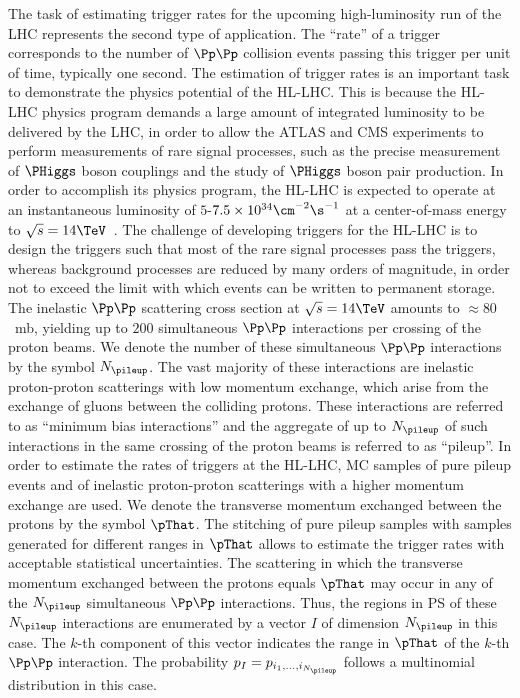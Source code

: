 The task of estimating trigger rates for the upcoming high-luminosity run of the LHC represents the second type of application.
The ``rate'' of a trigger corresponds to the number of $\Pp\Pp$ collision events passing this trigger per unit of time, typically one second.
The estimation of trigger rates is an important task to demonstrate the physics potential of the HL-LHC.
This is because the HL-LHC physics program demands a large amount of integrated luminosity to be delivered by the LHC,
in order to allow the ATLAS and CMS experiments to perform measurements of rare signal processes,
such as the precise measurement of $\PHiggs$ boson couplings and the study of $\PHiggs$ boson pair production.
In order to accomplish its physics program, the HL-LHC is expected to operate at an instantaneous luminosity of $5$-$7.5 \times 10^{34}\cm^{-2}\s^{-1}$
at a center-of-mass energy to $\sqrt{s} = 14\TeV$~\cite{TDR_Phase2_lhc}.
The challenge of developing triggers for the HL-LHC is to design the triggers such that most of the rare signal processes pass the triggers,
whereas background processes are reduced by many orders of magnitude, in order not to exceed the limit with which events can be written to permanent storage.
The inelastic $\Pp\Pp$ scattering cross section at $\sqrt{s} = 14\TeV$ amounts to $\approx 80$~mb,
yielding up to $200$ simultaneous $\Pp\Pp$ interactions per crossing of the proton beams. 
We denote the number of these simultaneous $\Pp\Pp$ interactions by the symbol $N_{\pileup}$.
The vast majority of these interactions are inelastic proton-proton scatterings with low momentum exchange,
which arise from the exchange of gluons between the colliding protons.
These interactions are referred to as ``minimum bias interactions'' and the aggregate of up to $N_{\pileup}$ of such interactions in the same crossing of the proton beams is referred to as ``pileup''.
In order to estimate the rates of triggers at the HL-LHC,
MC samples of pure pileup events and of inelastic proton-proton scatterings with a higher momentum exchange are used.
We denote the transverse momentum exchanged between the protons by the symbol $\pThat$.
The stitching of pure pileup samples with samples generated for different ranges in $\pThat$ allows to estimate the trigger rates with acceptable statistical uncertainties.
The scattering in which the transverse momentum exchanged between the protons equals $\pThat$ may occur in any of the $N_{\pileup}$ simultaneous $\Pp\Pp$ interactions.
Thus, the regions in PS of these $N_{\pileup}$ interactions are enumerated by a vector $I$ of dimension $N_{\pileup}$ in this case.
The $k$-th component of this vector indicates the range in $\pThat$ of the $k$-th $\Pp\Pp$ interaction.
The probability $p_{I} = p_{i_{1},\dots,i_{N_{\pileup}}}$ follows a multinomial distribution in this case.





